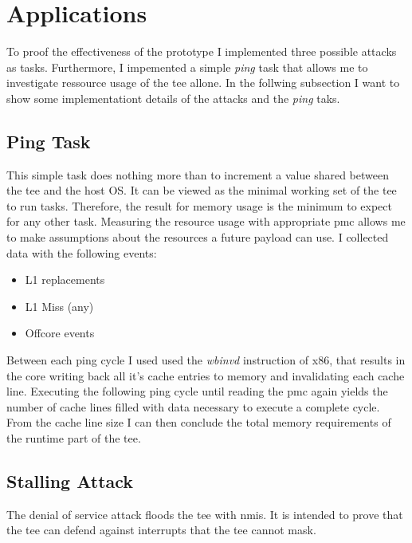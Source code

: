 \section{Applications}
\label{sec:implementation:attacks}
To proof the effectiveness of the prototype I implemented three possible attacks
as tasks. Furthermore, I impemented a simple \textit{ping} task that allows me
to investigate ressource usage of the \gls{tee} allone. In the follwing
subsection I want to show some implementationt details of the attacks and the
\textit{ping} taks.

\subsection{Ping Task}
\label{sec:implementation:attacks:ping}
This simple task does nothing more than to increment a value shared between the
\gls{tee} and the host OS. It can be viewed as the minimal working set of the
\gls{tee} to run tasks. Therefore, the result for memory usage is the minimum to
expect for any other task. Measuring the resource usage with appropriate
\gls{pmc} allows me to make assumptions about the resources a future payload can
use. I collected data with the following events:
\begin{itemize}
    \item L1 replacements
    \item L1 Miss (any)
    \item Offcore events 
\end{itemize}
Between each ping cycle I used used the \textit{wbinvd} instruction of x86, that
results in the core writing back all it's cache entries to memory and
invalidating each cache line. Executing the following ping cycle until reading
the \gls{pmc} again yields the number of cache lines filled with data necessary
to execute a complete cycle. From the cache line size I can then conclude the
total memory requirements of the runtime part of the \gls{tee}.

\subsection{Stalling Attack}
The denial of service attack floods the \gls{tee} with \glspl{nmi}. It is
intended to prove that the \gls{tee} can defend against interrupts that the
\gls{tee} cannot mask.

